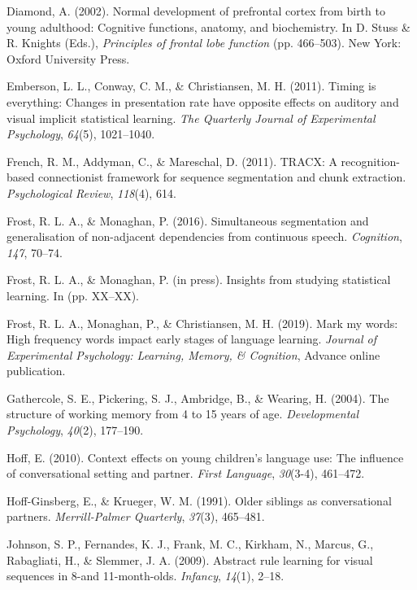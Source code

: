 \documentclass[man,mask,floatsintext]{apa6}
\begin{document}
\hypertarget{ref-diamond2002normal}{}
Diamond, A. (2002). Normal development of prefrontal cortex from birth
to young adulthood: Cognitive functions, anatomy, and biochemistry. In
D. Stuss \& R. Knights (Eds.), \emph{Principles of frontal lobe
function} (pp. 466--503). New York: Oxford University Press.

\hypertarget{ref-emberson2011timing}{}
Emberson, L. L., Conway, C. M., \& Christiansen, M. H. (2011). Timing is
everything: Changes in presentation rate have opposite effects on
auditory and visual implicit statistical learning. \emph{The Quarterly
Journal of Experimental Psychology}, \emph{64}(5), 1021--1040.

\hypertarget{ref-french2011tracx}{}
French, R. M., Addyman, C., \& Mareschal, D. (2011). TRACX: A
recognition-based connectionist framework for sequence segmentation and
chunk extraction. \emph{Psychological Review}, \emph{118}(4), 614.

\hypertarget{ref-frost2016simultaneous}{}
Frost, R. L. A., \& Monaghan, P. (2016). Simultaneous segmentation and
generalisation of non-adjacent dependencies from continuous speech.
\emph{Cognition}, \emph{147}, 70--74.

\hypertarget{ref-frostInPressinsights}{}
Frost, R. L. A., \& Monaghan, P. (in press). Insights from studying
statistical learning. In (pp. XX--XX).

\hypertarget{ref-frost2019}{}
Frost, R. L. A., Monaghan, P., \& Christiansen, M. H. (2019). Mark my
words: High frequency words impact early stages of language learning.
\emph{Journal of Experimental Psychology: Learning, Memory, \&
Cognition}, Advance online publication.

\hypertarget{ref-gathercole2004structure}{}
Gathercole, S. E., Pickering, S. J., Ambridge, B., \& Wearing, H.
(2004). The structure of working memory from 4 to 15 years of age.
\emph{Developmental Psychology}, \emph{40}(2), 177--190.

\hypertarget{ref-hoff2010context}{}
Hoff, E. (2010). Context effects on young children's language use: The
influence of conversational setting and partner. \emph{First Language},
\emph{30}(3-4), 461--472.

\hypertarget{ref-hoff1991older}{}
Hoff-Ginsberg, E., \& Krueger, W. M. (1991). Older siblings as
conversational partners. \emph{Merrill-Palmer Quarterly}, \emph{37}(3),
465--481.

\hypertarget{ref-johnson2009abstract}{}
Johnson, S. P., Fernandes, K. J., Frank, M. C., Kirkham, N., Marcus, G.,
Rabagliati, H., \& Slemmer, J. A. (2009). Abstract rule learning for
visual sequences in 8-and 11-month-olds. \emph{Infancy}, \emph{14}(1),
2--18.
\end{document}
